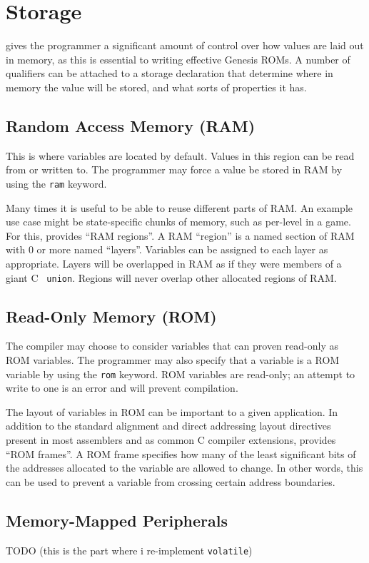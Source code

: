 \section{Storage}

\gx{} gives the programmer a significant amount of control over how values
are laid out in memory, as this is essential to writing effective Genesis
ROMs. A number of qualifiers can be attached to a storage declaration
that determine where in memory the value will be stored, and what sorts
of properties it has.

\subsection{Random Access Memory (RAM)}

This is where variables are located by default. Values in this region
can be read from or written to. The programmer may force a value be
stored in RAM by using the {\tt ram} keyword.

Many times it is useful to be able to reuse different parts of RAM. An
example use case might be state-specific chunks of memory, such as
per-level in a game. For this, \gx{} provides ``RAM regions''. A
RAM ``region'' is a named section of RAM with 0 or more named
``layers''. Variables can be assigned to each layer as appropriate. Layers
will be overlapped in RAM as if they were members of a giant C {\tt
union}. Regions will never overlap other allocated regions of RAM.

\subsection{Read-Only Memory (ROM)}

The compiler may choose to consider variables that can proven read-only
as ROM variables. The programmer may also specify that a variable is a
ROM variable by using the {\tt rom} keyword. ROM variables are read-only;
an attempt to write to one is an error and will prevent compilation.

The layout of variables in ROM can be important to a given application. In
addition to the standard alignment and direct addressing layout directives
present in most assemblers and as common C compiler extensions, \gx{}
provides ``ROM frames''. A ROM frame specifies how many of the least
significant bits of the addresses allocated to the variable are allowed
to change. In other words, this can be used to prevent a variable from
crossing certain address boundaries.

\subsection{Memory-Mapped Peripherals}

TODO (this is the part where i re-implement {\tt volatile})
